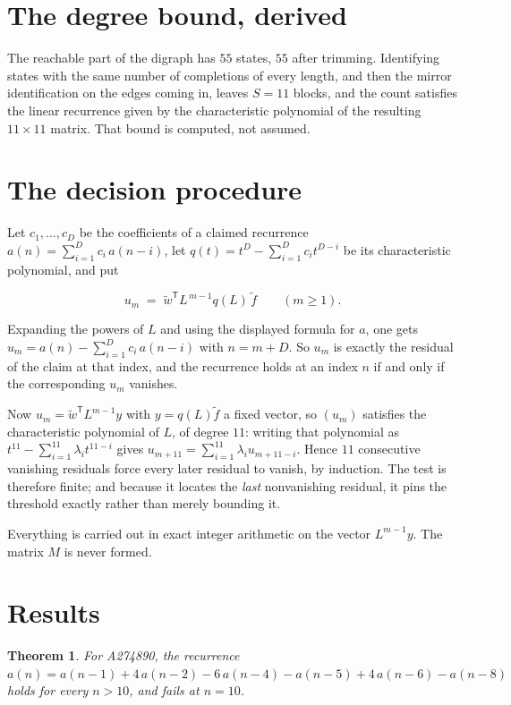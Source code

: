 \documentclass[11pt]{article}
\newtheorem{theorem}{Theorem}
\theoremstyle{definition}
\begin{document}
\section{The degree bound, derived}

The reachable part of the digraph has $55$ states, $55$ after trimming. Identifying states with the same number of completions of every length, and then the mirror identification on the edges coming in, leaves $S = 11$ blocks, and the count satisfies the linear recurrence given by the characteristic polynomial of the resulting $11\times11$ matrix. That bound is computed, not assumed.

\section{The decision procedure}

Let $c_1,\dots,c_D$ be the coefficients of a claimed recurrence $a(n) = \sum_{i=1}^{D} c_i\,a(n-i)$, let $q(t) = t^{D} - \sum_{i=1}^{D} c_i t^{D-i}$ be its characteristic polynomial, and put

\[u_m \;=\; \tilde w^{\mathsf T} L^{\,m-1} q(L)\,\tilde f \qquad (m \ge 1).\]

Expanding the powers of $L$ and using the displayed formula for $a$, one gets $u_m = a(n) - \sum_{i=1}^{D} c_i\,a(n-i)$ with $n = m + D$. So $u_m$ is exactly the residual of the claim at that index, and the recurrence holds at an index $n$ if and only if the corresponding $u_m$ vanishes.

Now $u_m = \tilde w^{\mathsf T} L^{m-1} y$ with $y = q(L)\tilde f$ a fixed vector, so $(u_m)$ satisfies the characteristic polynomial of $L$, of degree $11$: writing that polynomial as $t^{11} - \sum_{i=1}^{11} \lambda_i t^{11-i}$ gives $u_{m+11} = \sum_{i=1}^{11} \lambda_i u_{m+11-i}$. Hence $11$ consecutive vanishing residuals force every later residual to vanish, by induction. The test is therefore finite; and because it locates the {\itshape last} nonvanishing residual, it pins the threshold exactly rather than merely bounding it.

Everything is carried out in exact integer arithmetic on the vector $L^{m-1}y$. The matrix $M$ is never formed.

\section{Results}

\begin{theorem} For A274890, the recurrence $a(n) = a(n-1) + 4\,a(n-2) - 6\,a(n-4) - a(n-5) + 4\,a(n-6) - a(n-8)$ holds for every $n > 10$, and fails at $n = 10$.\end{theorem}
\end{document}
